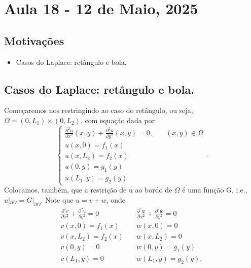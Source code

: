 \documentclass[../pde_notes.tex]{subfiles}
\begin{document}
\section{Aula 18 - 12 de Maio, 2025}
\subsection{Motivações}
\begin{itemize}
	\item Casos do Laplace: retângulo e bola.
\end{itemize}
\subsection{Casos do Laplace: retângulo e bola.}
Começaremos nos restringindo ao caso do retângulo, ou seja, \(\Omega = (0, L_1)\times (0,L_2)\), com equação dada por
\[
	\left\{\begin{array}{ll}
		\frac{\partial^{2}u}{\partial x^{2}}(x,y)+\frac{\partial^{2}u}{\partial y^{2}}(x,y)=0, & \quad (x,y)\in \Omega \\
		u(x,0) = f_1(x)                                                                                                \\
		u(x,L_2) = f_2(x)                                                                                              \\
		u(0,y)=g_1(y)                                                                                                  \\
		u(L_1, y) = g_2(y)
	\end{array}\right..
\]
Colocamos, também, que a restrição de u ao bordo de \(\Omega \) é uma função G, i.e., \(u|_{\partial \Omega } = G|_{\partial \Omega }.\) Note que \(u=v+w\), onde
\begin{align*}
	\frac{\partial^{2}v}{\partial x^{2}}+\frac{\partial^{2}v}{\partial y^{2}} = 0 & \quad \frac{\partial^{2}w}{\partial x^{2}}+\frac{\partial^{2}w}{\partial y^{2}}=0 \\
	v(x,0) = f_1(x)                                                               & \quad w(x,0)=0                                                                    \\
	v(x,L_2) = f_2(x)                                                             & \quad w(x,L_2)=0                                                                  \\
	v(0, y) = 0                                                                   & \quad w(0,y)=g_1(y)                                                               \\
	v(L_1, y) = 0                                                                 & \quad w(L_1, y) = g_2(y),
\end{align*}
\end{document}
